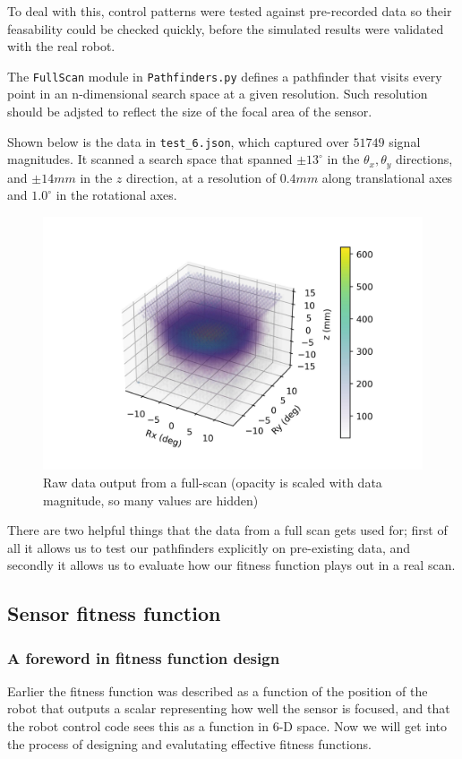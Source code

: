 \documentclass[11pt]{article}
\begin{document}
To deal with this, control patterns were tested against pre-recorded data so their feasability could be checked quickly, before the simulated results were validated with the real robot.

The \texttt{FullScan} module in \texttt{Pathfinders.py} defines a pathfinder that visits every point in an n-dimensional search space at a given resolution. Such resolution should be adjsted to reflect the size of the focal area of the sensor.

Shown below is the data in \texttt{test\_6.json}, which captured over $51749$ signal magnitudes. It scanned a search space that spanned $\pm 13^\circ$ in the $\theta_x,\theta_y$ directions, and $\pm 14 mm$ in the $z$ direction, at a resolution of $0.4 mm$ along translational axes and $1.0^\circ$ in the rotational axes.

\begin{figure}[ht]
    \includegraphics[width=.9\linewidth]{figures/fullscan_render_test_6.jpg}
    \caption{Raw data output from a full-scan (opacity is scaled with data magnitude, so many values are hidden)}\label{fig:fullscan-6}
\end{figure}

There are two helpful things that the data from a full scan gets used for; first of all it allows us to test our pathfinders explicitly on pre-existing data, and secondly it allows us to evaluate how our fitness function plays out in a real scan.

\subsection{Sensor fitness function}
\subsubsection{A foreword in fitness function design}
Earlier the fitness function was described as a function of the position of the robot that outputs a scalar representing how well the sensor is focused, and that the robot control code sees this as a function in 6-D space. Now we will get into the process of designing and evalutating effective fitness functions.
\end{document}
